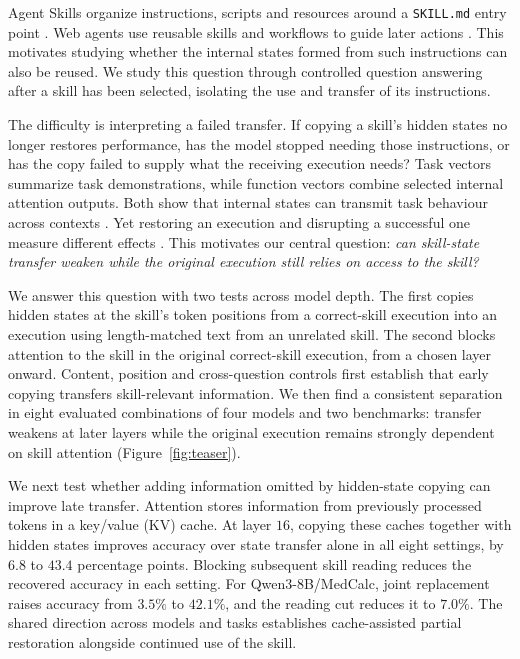 Agent Skills organize instructions, scripts and resources around a
\texttt{SKILL.md} entry point \citep{zhang2025agentskills}.
Web agents use reusable skills and workflows to guide later actions
\citep{wang2024awm,wang2026webxskill}. This motivates studying whether the
internal states formed from such instructions can also be reused. We
study this question through controlled question answering after a skill
has been selected, isolating the use and transfer of its instructions.

The difficulty is interpreting a failed transfer. If copying a skill's
hidden states no longer restores performance, has the model stopped
needing those instructions, or has the copy failed to supply what the
receiving execution needs? Task vectors summarize task demonstrations,
while function vectors combine selected internal attention outputs.
Both show that internal states can transmit task behaviour across contexts
\citep{hendel2023taskvectors,todd2024functionvectors}. Yet restoring an
execution and disrupting a successful one measure different effects
\citep{heimersheim2024patching}. This motivates our central question:
\emph{can skill-state transfer weaken while the original execution still
relies on access to the skill?}

We answer this question with two tests across model depth. The first
copies hidden states at the skill's token positions from a correct-skill
execution into an execution using length-matched text from an unrelated skill. The
second blocks attention to the skill in the original correct-skill
execution, from a chosen layer onward. Content, position and cross-question
controls first establish that early copying transfers skill-relevant
information. We then find a consistent separation in eight evaluated
combinations of four models and two benchmarks: transfer weakens at later
layers while the original execution remains strongly dependent on skill
attention (Figure~\ref{fig:teaser}).

We next test whether adding information omitted by hidden-state copying
can improve late transfer. Attention stores information from previously
processed tokens in a key/value (KV) cache. At layer $16$, copying these
caches together with hidden states improves accuracy over state transfer
alone in all eight settings, by $6.8$ to $43.4$ percentage points.
Blocking subsequent skill reading reduces the recovered accuracy in each
setting. For Qwen3-8B/MedCalc, joint replacement raises accuracy from
$3.5\%$ to $42.1\%$, and the reading cut reduces it to $7.0\%$.
The shared direction across models and tasks establishes cache-assisted
partial restoration alongside continued use of the skill.

